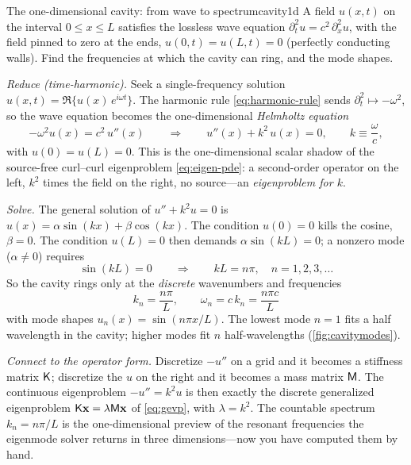 \begin{workedexample}{The one-dimensional cavity: from wave to spectrum}{cavity1d}
A field $u(x,t)$ on the interval $0\le x\le L$ satisfies the lossless wave
equation $\partial_t^2 u = c^2\,\partial_x^2 u$, with the field pinned to zero at
the ends, $u(0,t)=u(L,t)=0$ (perfectly conducting walls). Find the frequencies at
which the cavity can ring, and the mode shapes.

\medskip
\emph{Reduce (time-harmonic).} Seek a single-frequency solution
$u(x,t)=\Re\{u(x)\,e^{i\omega t}\}$. The harmonic rule \cref{eq:harmonic-rule}
sends $\partial_t^2\mapsto-\omega^2$, so the wave equation becomes the
one-dimensional \emph{Helmholtz equation}
\begin{equation*}
  -\omega^2 u(x) = c^2\,u''(x)
  \qquad\Longrightarrow\qquad
  u''(x) + k^2\,u(x) = 0,
  \qquad k \equiv \frac{\omega}{c},
\end{equation*}
with $u(0)=u(L)=0$. This is the one-dimensional scalar shadow of the
source-free curl--curl eigenproblem \cref{eq:eigen-pde}: a second-order operator
on the left, $k^2$ times the field on the right, no source---an
\emph{eigenproblem for $k$}.

\emph{Solve.} The general solution of $u''+k^2u=0$ is
$u(x)=\alpha\sin(kx)+\beta\cos(kx)$. The condition $u(0)=0$ kills the cosine,
$\beta=0$. The condition $u(L)=0$ then demands $\alpha\sin(kL)=0$; a nonzero mode
($\alpha\neq 0$) requires
\begin{equation*}
  \sin(kL) = 0
  \qquad\Longrightarrow\qquad
  kL = n\pi,\quad n=1,2,3,\dots
\end{equation*}
So the cavity rings only at the \emph{discrete} wavenumbers and frequencies
\begin{equation*}
  \boxed{\;k_n = \frac{n\pi}{L},\qquad \omega_n = c\,k_n = \frac{n\pi c}{L}\;}
\end{equation*}
with mode shapes $u_n(x)=\sin(n\pi x/L)$. The lowest mode $n=1$ fits a half
wavelength in the cavity; higher modes fit $n$ half-wavelengths
(\cref{fig:cavitymodes}).

\emph{Connect to the operator form.} Discretize $-u''$ on a grid and it becomes a
stiffness matrix $\mathsf{K}$; discretize the $u$ on the right and it becomes a mass
matrix $\mathsf{M}$. The continuous eigenproblem $-u''=k^2u$ is then exactly the
discrete generalized eigenproblem $\mathsf{K}\mathbf{x}=\lambda\mathsf{M}\mathbf{x}$ of \cref{eq:gevp},
with $\lambda=k^2$. The countable spectrum $k_n=n\pi/L$ is the one-dimensional
preview of the resonant frequencies the eigenmode solver returns in three
dimensions---now you have computed them by hand.
\end{workedexample}

